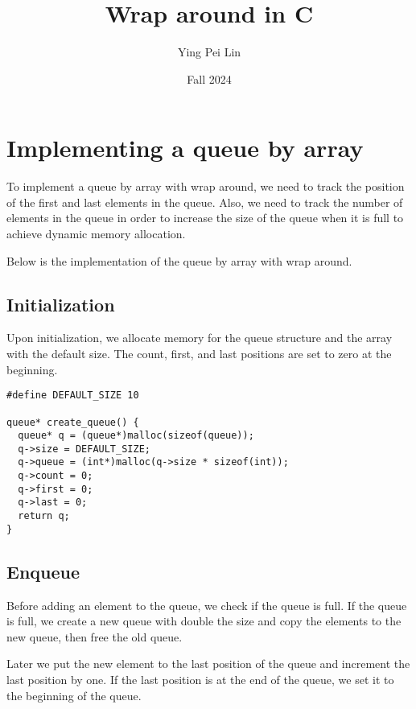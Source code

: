 \documentclass[a4paper,11pt]{article}
\begin{document}
\title{
  \textbf{Wrap around in C}
}
\author{Ying Pei Lin}
\date{Fall 2024}

\maketitle

\section*{Implementing a queue by array}

To implement a queue by array with wrap around, we need to track
the position of the first and last elements in the queue. Also, we
need to track the number of elements in the queue in order to increase
the size of the queue when it is full to achieve dynamic memory allocation.

Below is the implementation of the queue by array with wrap around.

\subsection*{Initialization}

Upon initialization, we allocate memory for the queue structure and
the array with the default size. The count, first, and last positions
are set to zero at the beginning.

\begin{verbatim}
#define DEFAULT_SIZE 10

queue* create_queue() {
  queue* q = (queue*)malloc(sizeof(queue));
  q->size = DEFAULT_SIZE;
  q->queue = (int*)malloc(q->size * sizeof(int));
  q->count = 0;  
  q->first = 0;
  q->last = 0;
  return q;
}
\end{verbatim}

\subsection*{Enqueue}

Before adding an element to the queue, we check if the queue is full.
If the queue is full, we create a new queue with double the size and
copy the elements to the new queue, then free the old queue.

Later we put the new element to the last position of the queue and
increment the last position by one. If the last position is at the end
of the queue, we set it to the beginning of the queue.
\end{document}
